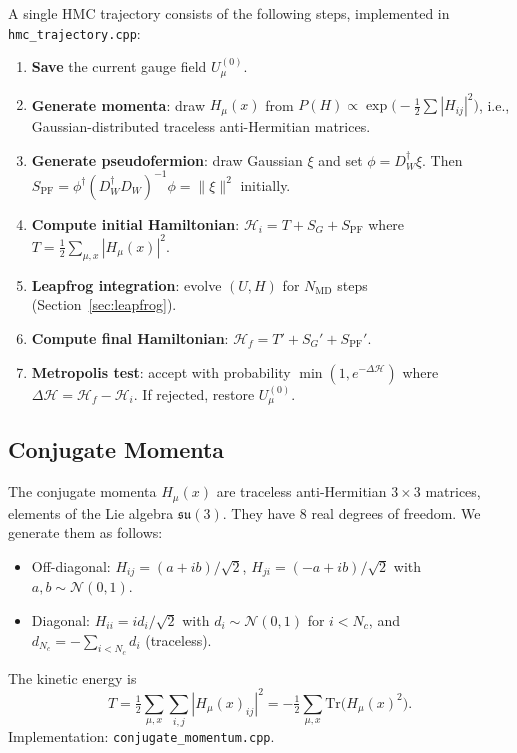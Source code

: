 \documentclass[12pt]{article}
\newcommand{\Tr}{\mathrm{Tr}}
\newcommand{\code}[1]{\texttt{#1}}
\newcommand{\half}{\tfrac{1}{2}}
\begin{document}
A single HMC trajectory consists of the following steps, implemented in \code{hmc\_trajectory.cpp}:
\begin{enumerate}
\item \textbf{Save} the current gauge field $U_\mu^{(0)}$.
\item \textbf{Generate momenta}: draw $H_\mu(x)$ from $P(H) \propto \exp\!\big(-\half \sum |H_{ij}|^2\big)$, i.e., Gaussian-distributed traceless anti-Hermitian matrices.
\item \textbf{Generate pseudofermion}: draw Gaussian $\xi$ and set $\phi = D_W^\dagger \xi$. Then $S_{\mathrm{PF}} = \phi^\dagger (D_W^\dagger D_W)^{-1} \phi = \|\xi\|^2$ initially.
\item \textbf{Compute initial Hamiltonian}: $\mathcal{H}_i = T + S_G + S_{\mathrm{PF}}$ where $T = \half \sum_{\mu,x} |H_\mu(x)|^2$.
\item \textbf{Leapfrog integration}: evolve $(U, H)$ for $N_{\mathrm{MD}}$ steps (Section~\ref{sec:leapfrog}).
\item \textbf{Compute final Hamiltonian}: $\mathcal{H}_f = T' + S_G' + S_{\mathrm{PF}}'$.
\item \textbf{Metropolis test}: accept with probability $\min(1, e^{-\Delta\mathcal{H}})$ where $\Delta\mathcal{H} = \mathcal{H}_f - \mathcal{H}_i$. If rejected, restore $U_\mu^{(0)}$.
\end{enumerate}

\subsection{Conjugate Momenta}
\label{sec:momenta}

The conjugate momenta $H_\mu(x)$ are traceless anti-Hermitian $3 \times 3$ matrices, elements of the Lie algebra $\mathfrak{su}(3)$. They have 8 real degrees of freedom. We generate them as follows:
\begin{itemize}
\item Off-diagonal: $H_{ij} = (a + ib)/\sqrt{2}$, $H_{ji} = (-a + ib)/\sqrt{2}$ with $a, b \sim \mathcal{N}(0,1)$.
\item Diagonal: $H_{ii} = i d_i / \sqrt{2}$ with $d_i \sim \mathcal{N}(0,1)$ for $i < N_c$, and $d_{N_c} = -\sum_{i<N_c} d_i$ (traceless).
\end{itemize}
The kinetic energy is
\begin{equation}
\label{eq:kinetic}
T = \half \sum_{\mu, x} \sum_{i,j} |H_\mu(x)_{ij}|^2 = -\half \sum_{\mu,x} \Tr\!\big(H_\mu(x)^2\big).
\end{equation}
Implementation: \code{conjugate\_momentum.cpp}.
\end{document}
